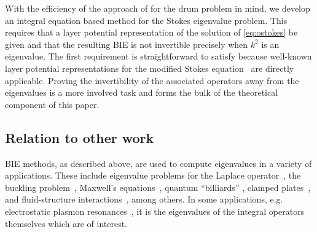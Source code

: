 With the efficiency of the approach of
\cite{zhao2015robust} for the drum problem in mind,
we develop an integral equation based method for the
Stokes eigenvalue problem.
%
This requires that a layer
potential representation of the solution
of \cref{eq:ostokes} be given and that the resulting BIE
is not invertible precisely when $k^2$ is an eigenvalue.
%
The first requirement is straightforward to
satisfy because 
well-known layer potential representations for the
modified Stokes equation~\cite{Pozrikidis1992,biros2002embedded,jiang2013second,ladyzhenskaya1969mathematical}
are directly applicable.
%
Proving the invertibility of the associated operators
away from the eigenvalues is a more involved task
and forms the bulk of the theoretical component
of this paper.

\subsection{Relation to other work}

{\color{red} BIE methods, as described above, are used
  to compute eigenvalues in a
  variety of applications. These include eigenvalue problems
  for the Laplace operator~\cite{lu1991eigenvalues,steinbach2012convergence,akhmetgaliyev2015boundary,zhao2015robust}, the buckling problem~\cite{kitahara2014boundary,antunes2011buckling},
  Maxwell's equations~\cite{kirsch2007integral}, quantum ``billiards''
  \cite{backer2003numerical,tureci2007efficient,veble2007expanded,barnett2006asymptotic}, clamped plates~\cite{lindsay2018boundary}, 
  and fluid-structure interactions~\cite{kimeswenger2014coupled},
  among others. In some applications, e.g. electrostatic plasmon
  resonances~\cite{mayergoyz2005electrostatic}, it is the eigenvalues
  of the integral operators themselves which are of interest. }

